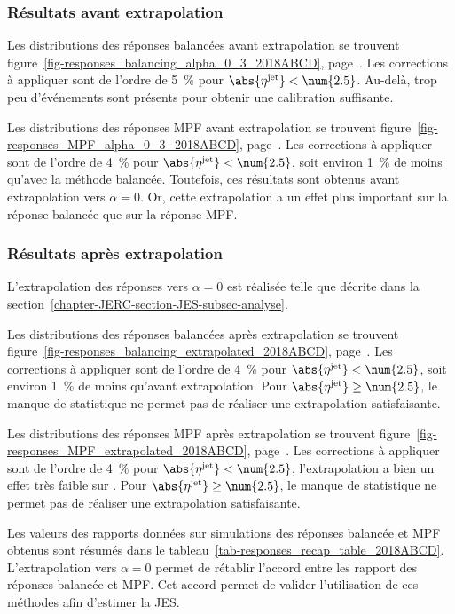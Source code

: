 \subsubsection{Résultats avant extrapolation}\label{chapter-JERC-section-JES-subsec-results-subsubsec-before_extrap}
\par Les distributions des réponses balancées avant extrapolation se trouvent figure~\ref{fig-responses_balancing_alpha_0_3_2018ABCD}, page~\pageref{fig-responses_balancing_alpha_0_3_2018ABCD}.
Les corrections à appliquer sont de l'ordre de \SI{5}{\%} pour $\abs{\eta^\text{jet}} < \num{2.5}$.
Au-delà, trop peu d'événements sont présents pour obtenir une calibration suffisante.
\par Les distributions des réponses MPF avant extrapolation se trouvent figure~\ref{fig-responses_MPF_alpha_0_3_2018ABCD}, page~\pageref{fig-responses_MPF_alpha_0_3_2018ABCD}.
Les corrections à appliquer sont de l'ordre de \SI{4}{\%} pour $\abs{\eta^\text{jet}} < \num{2.5}$, soit environ \SI{1}{\%} de moins qu'avec la méthode balancée.
Toutefois, ces résultats sont obtenus avant extrapolation vers $\alpha=0$. Or, cette extrapolation a un effet plus important sur la réponse balancée que sur la réponse MPF.
\subsubsection{Résultats après extrapolation}\label{chapter-JERC-section-JES-subsec-results-subsubsec-after_extrap}
L'extrapolation des réponses vers $\alpha=0$ est réalisée telle que décrite dans la section~\ref{chapter-JERC-section-JES-subsec-analyse}.
\par Les distributions des réponses balancées après extrapolation se trouvent figure~\ref{fig-responses_balancing_extrapolated_2018ABCD}, page~\pageref{fig-responses_balancing_extrapolated_2018ABCD}.
Les corrections à appliquer sont de l'ordre de \SI{4}{\%} pour $\abs{\eta^\text{jet}} < \num{2.5}$, soit environ \SI{1}{\%} de moins qu'avant extrapolation.
Pour $\abs{\eta^\text{jet}}\geq\num{2.5}$, le manque de statistique ne permet pas de réaliser une extrapolation satisfaisante.
\par Les distributions des réponses MPF après extrapolation se trouvent figure~\ref{fig-responses_MPF_extrapolated_2018ABCD}, page~\pageref{fig-responses_MPF_extrapolated_2018ABCD}.
Les corrections à appliquer sont de l'ordre de \SI{4}{\%} pour $\abs{\eta^\text{jet}} < \num{2.5}$, l'extrapolation a bien un effet très faible sur \RMPF.
Pour $\abs{\eta^\text{jet}}\geq\num{2.5}$, le manque de statistique ne permet pas de réaliser une extrapolation satisfaisante.
\par Les valeurs des rapports données sur simulations des réponses balancée et MPF obtenus sont résumés dans le tableau~\ref{tab-responses_recap_table_2018ABCD}.
L'extrapolation vers $\alpha=0$ permet de rétablir l'accord entre les rapport des réponses balancée et MPF.
Cet accord permet de valider l'utilisation de ces méthodes afin d'estimer la JES.

